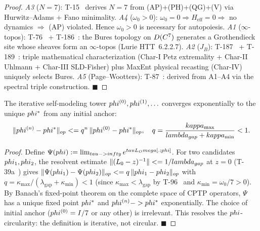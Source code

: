 \begin{proof}
\emph{A3} ($N = 7$): T-15~ derives $N = 7$ from (AP)+(PH)+(QG)+(V)
via Hurwitz--Adams + Fano minimality.
\emph{A4} ($\omega_0 > 0$): $\omega_0 = 0 \Rightarrow H_{\mathrm{eff}} = 0
\Rightarrow$ no dynamics $\Rightarrow$ (AP) violated. Hence $\omega_0 > 0$
is necessary for autopoiesis.
\emph{A1} ($\infty$-topos): T-76~ + T-186~: the Bures
topology on $D(C^7)$ generates a Grothendieck site whose
sheaves form an $\infty$-topos (Lurie HTT~6.2.2.7).
\emph{A2} ($J_B$): T-187~ + T-189~: triple mathematical
characterization (Char-I Petz extremality + Char-II Uhlmann + Char-III
SLD-Fisher) plus MaxEnt physical recasting (Char-IV) uniquely selects Bures.
\emph{A5} (Page--Wootters): T-87~: derived from A1--A4 via
the spectral triple construction. $\blacksquare$
\end{proof}

\begin{theorembox}
\label{thm:t191-convergence}
The iterative self-modeling tower $phi^{(0)}, phi^{(1)}, \ldots$ converges
exponentially to the unique $phi^*$ from any initial anchor:
\begin{equation}
  \|phi^{(n)} - phi^*\|_{op} <= q^n\,\|phi^{(0)} - phi^*\|_{op},
  \quad q = \frac{kappa_{\max}}{lambda_{gap} + kappa_{\min}} < 1.
  \label{eq:phi-tower-convergence}
\end{equation}
\end{theorembox}

\begin{proof}
Define $\Psi(phi) := \lim_{tau -> infty} e^{tauL_Omega[.;phi]}$.
For two candidates $phi_1, phi_2$, the resolvent estimate
$\|(L_0 - z)^{-1}\| <= 1/lambda_{gap}$ at $z = 0$
(T-39a~) gives
$\|\Psi(phi_1) - \Psi(phi_2)\|_{op} <= q\,\|phi_1 - phi_2\|_{op}$
with $q = \kappa_{\max}/(\lambda_{\mathrm{gap}} + \kappa_{\min}) < 1$
(since $\kappa_{\max} < \lambda_{\mathrm{gap}}$ by T-96~ and
$\kappa_{\min} = \omega_0/7 > 0$). By Banach's fixed-point theorem
on the complete space of CPTP operators, $\Psi$ has a unique fixed point
$phi^*$ and $phi^{(n)} -> phi^*$ exponentially. The choice of
initial anchor ($phi^{(0)} = I/7$ or any other) is irrelevant.
This resolves the $phi$-circularity: the definition is iterative,
not circular. $\blacksquare$
\end{proof}

